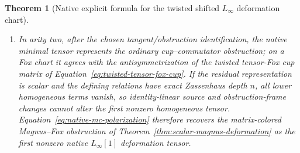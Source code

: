 \documentclass[11pt]{article}
\newtheorem{theorem}{Theorem}[section]
\theoremstyle{definition}
\begin{document}
\begin{theorem}[Native explicit formula for the twisted shifted $L_\infty$ deformation chart]
\begin{enumerate}[label=\textnormal{(\roman*)}]
\item In arity two, after the chosen tangent/obstruction identification, the
native minimal tensor represents the ordinary cup--commutator obstruction;
on a Fox chart it agrees with the antisymmetrization of the twisted tensor-Fox
cup matrix of Equation~\eqref{eq:twisted-tensor-fox-cup}.  If the residual
representation is scalar and the defining relations have exact Zassenhaus
depth $n$, all lower homogeneous terms vanish, so identity-linear source and
obstruction-frame changes cannot alter the first nonzero homogeneous tensor.
Equation~\eqref{eq:native-mc-polarization} therefore recovers the
matrix-colored Magnus--Fox obstruction of
Theorem~\ref{thm:scalar-magnus-deformation} as the first nonzero native
$L_\infty[1]$ deformation tensor.
\end{enumerate}
\end{theorem}
\end{document}
